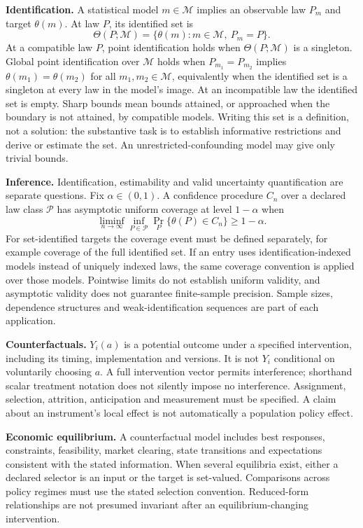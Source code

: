 \documentclass[11pt,a4paper]{article}
\begin{document}
\textbf{Identification.} A statistical model $m\in\mathcal M$ implies an observable law $P_m$ and target $\theta(m)$. At law $P$, its identified set is
\[
\Theta(P;\mathcal M)=\{\theta(m):m\in\mathcal M,\ P_m=P\}.
\]
At a compatible law $P$, point identification holds when $\Theta(P;\mathcal M)$ is a singleton. Global point identification over $\mathcal M$ holds when $P_{m_1}=P_{m_2}$ implies $\theta(m_1)=\theta(m_2)$ for all $m_1,m_2\in\mathcal M$, equivalently when the identified set is a singleton at every law in the model's image. At an incompatible law the identified set is empty. Sharp bounds mean bounds attained, or approached when the boundary is not attained, by compatible models. Writing this set is a definition, not a solution: the substantive task is to establish informative restrictions and derive or estimate the set. An unrestricted-confounding model may give only trivial bounds.

\textbf{Inference.} Identification, estimability and valid uncertainty quantification are separate questions. Fix $\alpha\in(0,1)$. A confidence procedure $C_n$ over a declared law class $\mathcal P$ has asymptotic uniform coverage at level $1-\alpha$ when
\[
\liminf_{n\to\infty}\inf_{P\in\mathcal P}\Pr_P\{\theta(P)\in C_n\}\geq1-\alpha.
\]
For set-identified targets the coverage event must be defined separately, for example coverage of the full identified set. If an entry uses identification-indexed models instead of uniquely indexed laws, the same coverage convention is applied over those models. Pointwise limits do not establish uniform validity, and asymptotic validity does not guarantee finite-sample precision. Sample sizes, dependence structures and weak-identification sequences are part of each application.

\textbf{Counterfactuals.} $Y_i(a)$ is a potential outcome under a specified intervention, including its timing, implementation and versions. It is not $Y_i$ conditional on voluntarily choosing $a$. A full intervention vector permits interference; shorthand scalar treatment notation does not silently impose no interference. Assignment, selection, attrition, anticipation and measurement must be specified. A claim about an instrument's local effect is not automatically a population policy effect.

\textbf{Economic equilibrium.} A counterfactual model includes best responses, constraints, feasibility, market clearing, state transitions and expectations consistent with the stated information. When several equilibria exist, either a declared selector is an input or the target is set-valued. Comparisons across policy regimes must use the stated selection convention. Reduced-form relationships are not presumed invariant after an equilibrium-changing intervention.
\end{document}
